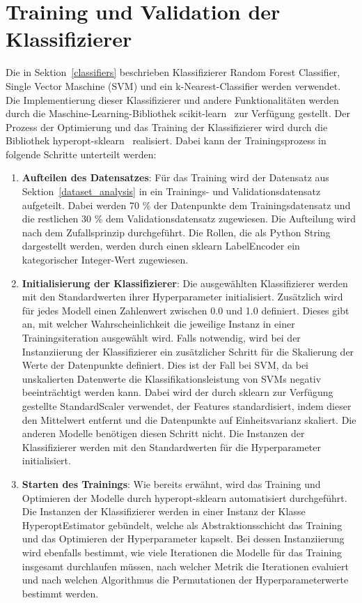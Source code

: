 \section{Training und Validation der Klassifizierer}

Die in Sektion~\ref{classifiers} beschrieben Klassifizierer Random Forest Classifier, Single Vector Maschine (SVM) und ein k-Nearest-Classifier werden verwendet.
Die Implementierung dieser Klassifizierer und andere Funktionalitäten werden durch die Maschine-Learning-Bibliothek scikit-learn~\cite{scikit-learn} zur Verfügung gestellt.
Der Prozess der Optimierung und das Training der Klassifizierer wird durch die Bibliothek hyperopt-sklearn~\cite{Komer2019} realisiert. 
Dabei kann der Trainingsprozess in folgende Schritte unterteilt werden:

\begin{enumerate}
    \item \textbf{Aufteilen des Datensatzes}: Für das Training wird der Datensatz aus Sektion~\ref{dataset_analysis} in ein Trainings- und Validationsdatensatz aufgeteilt. Dabei werden 70 \% der Datenpunkte dem Trainingsdatensatz und die restlichen 30 \% dem Validationsdatensatz zugewiesen.
    Die Aufteilung wird nach dem Zufallsprinzip durchgeführt. Die Rollen, die als Python String dargestellt werden, werden durch einen sklearn LabelEncoder ein kategorischer Integer-Wert zugewiesen. 
    \item \textbf{Initialisierung der Klassifizierer}: Die ausgewählten Klassifizierer werden mit den Standardwerten ihrer Hyperparameter initialisiert.
    Zusätzlich wird für jedes Modell einen Zahlenwert zwischen 0.0 und 1.0 definiert. Dieses gibt an, mit welcher Wahrscheinlichkeit die jeweilige Instanz in einer Trainingsiteration ausgewählt wird. Falls notwendig, wird bei der Instanziierung der Klassifizierer ein zusätzlicher Schritt für die Skalierung der Werte der Datenpunkte definiert.
    Dies ist der Fall bei SVM, da bei unskalierten Datenwerte die Klassifikationsleistung von SVMs negativ beeinträchtigt werden kann. Dabei wird der durch sklearn zur Verfügung gestellte StandardScaler verwendet, der Features standardisiert, indem dieser den Mittelwert entfernt und die Datenpunkte auf Einheitsvarianz skaliert. Die anderen Modelle benötigen diesen Schritt nicht.
    Die Instanzen der Klassifizierer werden mit den Standardwerten für die Hyperparameter initialisiert.
    \item \textbf{Starten des Trainings}: Wie bereits erwähnt, wird das Training und Optimieren der Modelle durch hyperopt-sklearn automatisiert durchgeführt. Die Instanzen der Klassifizierer werden in einer Instanz der Klasse HyperoptEstimator gebündelt, welche als Abstraktionsschicht das Training und das Optimieren der Hyperparameter kapselt. Bei dessen Instanziierung wird ebenfalls bestimmt, wie viele Iterationen die Modelle für das Training insgesamt durchlaufen müssen, nach welcher Metrik die Iterationen evaluiert und nach welchen Algorithmus die Permutationen der Hyperparameterwerte bestimmt werden. 

\end{enumerate}
